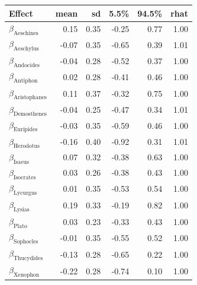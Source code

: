 
\begin{tabular}[t]{lrrrrr}
\toprule
Effect & mean & sd & 5.5\% & 94.5\% & rhat\\
\midrule
$\beta_{\text{Aeschines}}$ & 0.15 & 0.35 & -0.25 & 0.77 & 1.00\\
$\beta_{\text{Aeschylus}}$ & -0.07 & 0.35 & -0.65 & 0.39 & 1.01\\
$\beta_{\text{Andocides}}$ & -0.04 & 0.28 & -0.52 & 0.37 & 1.00\\
$\beta_{\text{Antiphon}}$ & 0.02 & 0.28 & -0.41 & 0.46 & 1.00\\
$\beta_{\text{Aristophanes}}$ & 0.11 & 0.37 & -0.32 & 0.75 & 1.00\\
\addlinespace
$\beta_{\text{Demosthenes}}$ & -0.04 & 0.25 & -0.47 & 0.34 & 1.01\\
$\beta_{\text{Euripides}}$ & -0.03 & 0.35 & -0.59 & 0.46 & 1.00\\
$\beta_{\text{Herodotus}}$ & -0.16 & 0.40 & -0.92 & 0.31 & 1.01\\
$\beta_{\text{Isaeus}}$ & 0.07 & 0.32 & -0.38 & 0.63 & 1.00\\
$\beta_{\text{Isocrates}}$ & 0.03 & 0.26 & -0.38 & 0.43 & 1.00\\
\addlinespace
$\beta_{\text{Lycurgus}}$ & 0.01 & 0.35 & -0.53 & 0.54 & 1.00\\
$\beta_{\text{Lysias}}$ & 0.19 & 0.33 & -0.19 & 0.82 & 1.00\\
$\beta_{\text{Plato}}$ & 0.03 & 0.23 & -0.33 & 0.43 & 1.00\\
$\beta_{\text{Sophocles}}$ & -0.01 & 0.35 & -0.55 & 0.52 & 1.00\\
$\beta_{\text{Thucydides}}$ & -0.13 & 0.28 & -0.65 & 0.22 & 1.00\\
\addlinespace
$\beta_{\text{Xenophon}}$ & -0.22 & 0.28 & -0.74 & 0.10 & 1.00\\
\bottomrule
\end{tabular}
